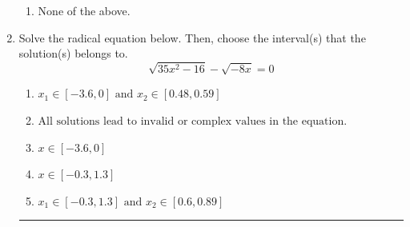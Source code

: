 \documentclass[14pt]{extbook}
\newcommand{\litem}[1]{\item#1\hspace*{-1cm}\rule{\textwidth}{0.4pt}}
\begin{document}
\begin{enumerate}
{\begin{enumerate}[label=\Alph*.]
\item None of the above.
\end{enumerate} }
\litem{
Solve the radical equation below. Then, choose the interval(s) that the solution(s) belongs to.\[ \sqrt{35 x^2 - 16} - \sqrt{-8 x} = 0 \]\begin{enumerate}[label=\Alph*.]
\item \( x_1 \in [-3.6, 0] \text{ and } x_2 \in [0.48,0.59] \)
\item \( \text{All solutions lead to invalid or complex values in the equation.} \)
\item \( x \in [-3.6,0] \)
\item \( x \in [-0.3,1.3] \)
\item \( x_1 \in [-0.3, 1.3] \text{ and } x_2 \in [0.6,0.89] \)


\end{enumerate}}
\end{enumerate}
\end{document}
